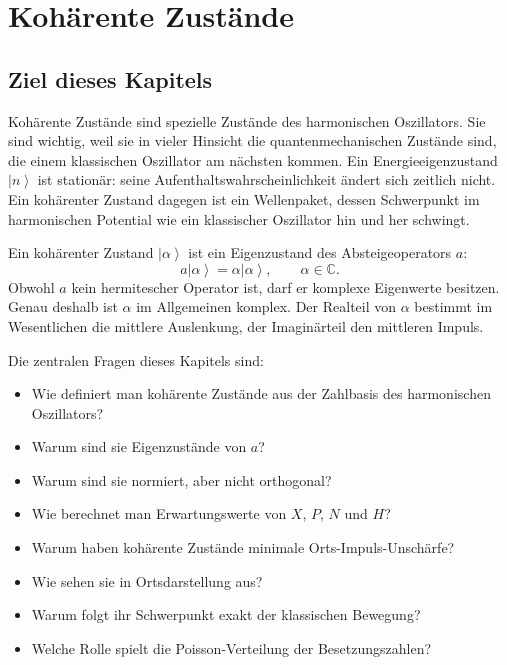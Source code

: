 \providecommand{\ket}[1]{\left|#1\right\rangle}
\providecommand{\bra}[1]{\left\langle#1\right|}
\providecommand{\braket}[2]{\left\langle#1\middle|#2\right\rangle}
\providecommand{\mel}[3]{\left\langle#1\middle|#2\middle|#3\right\rangle}
\providecommand{\proj}[1]{\left|#1\right\rangle\left\langle#1\right|}

\chapter{Kohärente Zustände}

\section{Ziel dieses Kapitels}

Kohärente Zustände sind spezielle Zustände des harmonischen Oszillators. Sie sind wichtig, weil sie in vieler Hinsicht die quantenmechanischen Zustände sind, die einem klassischen Oszillator am nächsten kommen. Ein Energieeigenzustand \(\ket{n}\) ist stationär: seine Aufenthaltswahrscheinlichkeit ändert sich zeitlich nicht. Ein kohärenter Zustand dagegen ist ein Wellenpaket, dessen Schwerpunkt im harmonischen Potential wie ein klassischer Oszillator hin und her schwingt.

\begin{conceptbox}
Ein kohärenter Zustand \(\ket{\alpha}\) ist ein Eigenzustand des Absteigeoperators \(a\):
\[
    a\ket{\alpha}=\alpha\ket{\alpha},
    \qquad \alpha\in\mathbb{C}.
\]
Obwohl \(a\) kein hermitescher Operator ist, darf er komplexe Eigenwerte besitzen. Genau deshalb ist \(\alpha\) im Allgemeinen komplex. Der Realteil von \(\alpha\) bestimmt im Wesentlichen die mittlere Auslenkung, der Imaginärteil den mittleren Impuls.
\end{conceptbox}

Die zentralen Fragen dieses Kapitels sind:
\begin{itemize}
    \item Wie definiert man kohärente Zustände aus der Zahlbasis des harmonischen Oszillators?
    \item Warum sind sie Eigenzustände von \(a\)?
    \item Warum sind sie normiert, aber nicht orthogonal?
    \item Wie berechnet man Erwartungswerte von \(X\), \(P\), \(N\) und \(H\)?
    \item Warum haben kohärente Zustände minimale Orts-Impuls-Unschärfe?
    \item Wie sehen sie in Ortsdarstellung aus?
    \item Warum folgt ihr Schwerpunkt exakt der klassischen Bewegung?
    \item Welche Rolle spielt die Poisson-Verteilung der Besetzungszahlen?
\end{itemize}

